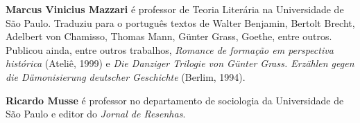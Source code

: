 \textbf{Marcus Vinicius Mazzari} é professor de Teoria Literária na Universidade
de São Paulo. Traduziu para o português textos de Walter Benjamin, Bertolt
Brecht, Adelbert von Chamisso, Thomas Mann, Günter Grass, Goethe, entre outros.
Publicou ainda, entre outros trabalhos, \textit{Romance de formação em perspectiva histórica}
(Ateliê, 1999) e \textit{Die Danziger Trilogie von Günter Grass. Erzählen gegen
die Dämonisierung deutscher Geschichte} (Berlim, 1994).

\textbf{Ricardo Musse} é professor no departamento de sociologia da Universidade
de São Paulo e editor do \textit{Jornal de Resenhas}.\par
